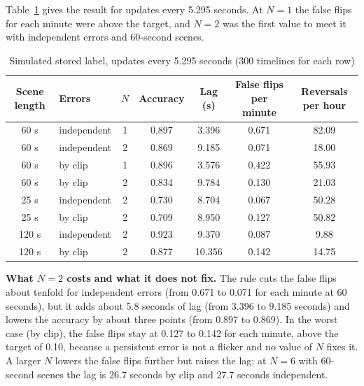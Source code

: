Table~\ref{tab:ai-sim} gives the result for updates every 5.295 seconds. At $N=1$ the false flips for each minute were above the target, and $N=2$ was the first value to meet it with independent errors and 60-second scenes.

\begin{table}[htbp]
    \centering
    \caption{Simulated stored label, updates every 5.295 seconds (300 timelines for each row)}\label{tab:ai-sim}
    \footnotesize
    \setlength{\tabcolsep}{3pt}
    \renewcommand{\arraystretch}{1.2}
    \begin{tabular}{|c|l|c|c|c|c|c|}
        \hline
        \textbf{Scene length} & \textbf{Errors} & \textbf{$N$} & \textbf{Accuracy} & \textbf{Lag (s)} & \textbf{False flips per minute} & \textbf{Reversals per hour} \\
        \hline
        60 s & independent & 1 & 0.897 & 3.396 & 0.671 & 82.09 \\
        \hline
        60 s & independent & 2 & 0.869 & 9.185 & 0.071 & 18.00 \\
        \hline
        60 s & by clip & 1 & 0.896 & 3.576 & 0.422 & 55.93 \\
        \hline
        60 s & by clip & 2 & 0.834 & 9.784 & 0.130 & 21.03 \\
        \hline
        25 s & independent & 2 & 0.730 & 8.704 & 0.067 & 50.28 \\
        \hline
        25 s & by clip & 2 & 0.709 & 8.950 & 0.127 & 50.82 \\
        \hline
        120 s & independent & 2 & 0.923 & 9.370 & 0.087 & 9.88 \\
        \hline
        120 s & by clip & 2 & 0.877 & 10.356 & 0.142 & 14.75 \\
        \hline
    \end{tabular}
\end{table}

\textbf{What $N=2$ costs and what it does not fix.} The rule cuts the false flips about tenfold for independent errors (from 0.671 to 0.071 for each minute at 60 seconds), but it adds about 5.8 seconds of lag (from 3.396 to 9.185 seconds) and lowers the accuracy by about three points (from 0.897 to 0.869). In the worst case (by clip), the false flips stay at 0.127 to 0.142 for each minute, above the target of 0.10, because a persistent error is not a flicker and no value of $N$ fixes it. A larger $N$ lowers the false flips further but raises the lag: at $N=6$ with 60-second scenes the lag is 26.7 seconds by clip and 27.7 seconds independent.

